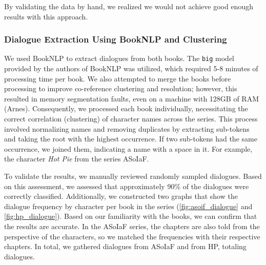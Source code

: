 \documentclass[fleqn,moreauthors,10pt]{ds_report}
\begin{document}
By validating the data by hand, we realized we would not achieve good enough results with this approach.

\subsubsection*{Dialogue Extraction Using BookNLP and Clustering}

We used BookNLP to extract dialogues from both books. The \texttt{big} model provided by the authors of BookNLP was utilized, which required 5-8 minutes of processing time per book. We also attempted to merge the books before processing to improve co-reference clustering and resolution; however, this resulted in memory segmentation faults, even on a machine with 128GB of RAM (Arnes). Consequently, we processed each book individually, necessitating the correct correlation (clustering) of character names across the series. This process involved normalizing names and removing duplicates by extracting sub-tokens and taking the root with the highest occurrence. If two sub-tokens had the same occurrence, we joined them, indicating a name with a space in it. For example, the character \textit{Hot Pie} from the series ASoIaF.

To validate the results, we manually reviewed randomly sampled dialogues. Based on this assessment, we assessed that approximately 90\% of the dialogues were correctly classified. Additionally, we constructed two graphs that show the dialogue frequency by character per book in the series (\cref{fig:asoif_dialogue} and \cref{fig:hp_dialogue}). Based on our familiarity with the books, we can confirm that the results are accurate. In the ASoIaF series, the chapters are also told from the perspective of the characters, so we matched the frequencies with their respective chapters. In total, we gathered  dialogues from ASoIaF and  from HP, totaling  dialogues.
\end{document}

